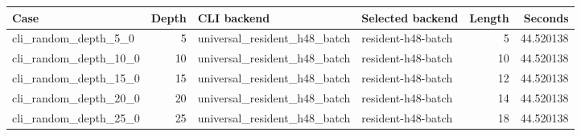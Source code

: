{\small
\begin{tabular}{lrllrr}
\hline
Case & Depth & CLI backend & Selected backend & Length & Seconds \\
\hline
cli\_random\_depth\_5\_0 & 5 & universal\_resident\_h48\_batch & resident-h48-batch & 5 & 44.520138 \\
cli\_random\_depth\_10\_0 & 10 & universal\_resident\_h48\_batch & resident-h48-batch & 10 & 44.520138 \\
cli\_random\_depth\_15\_0 & 15 & universal\_resident\_h48\_batch & resident-h48-batch & 12 & 44.520138 \\
cli\_random\_depth\_20\_0 & 20 & universal\_resident\_h48\_batch & resident-h48-batch & 14 & 44.520138 \\
cli\_random\_depth\_25\_0 & 25 & universal\_resident\_h48\_batch & resident-h48-batch & 18 & 44.520138 \\
\hline
\end{tabular}
}
